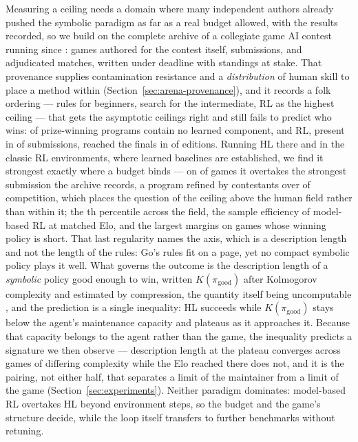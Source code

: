 Measuring a ceiling needs a domain where many independent authors already pushed the
symbolic paradigm as far as a real budget allowed, with the results recorded, so we
build \benchname on the complete archive of a collegiate game AI contest running
since :
games authored for the contest itself,  submissions, and 
adjudicated matches, written under deadline with standings at stake. That provenance
supplies contamination resistance and a \emph{distribution} of human skill to place a
method within (Section~\ref{sec:arena-provenance}), and it records a folk ordering --- rules
for beginners, search for the intermediate, RL as the highest ceiling --- that gets
the asymptotic ceilings right and still fails to predict who wins:  of
prize-winning programs contain no learned component, and RL, present in  of
submissions, reached the finals in  of  editions. Running
HL there and in the classic RL environments, where learned baselines are established,
we find it strongest exactly where a budget binds --- on  of
 games it overtakes the strongest submission the archive records, a
program refined by contestants over  of competition, which places
the question of the ceiling above the human field rather than within it; the
th percentile across the field,  the sample efficiency of
model-based RL at matched Elo, and the largest margins on games whose winning
policy is short. That last
regularity names the axis, which is a description length and not the length of the
rules: Go's rules fit on a page, yet no compact symbolic policy plays it well. What
governs the outcome is the description length of a \emph{symbolic} policy good enough
to win, written $K(\pi_{\mathrm{good}})$ after Kolmogorov complexity and estimated by
compression, the quantity itself being uncomputable
\citep{lividanyi2019kolmogorov,rissanen1978mdl}, and the prediction is a single
inequality: HL succeeds while $K(\pi_{\mathrm{good}})$ stays below the agent's
maintenance capacity and plateaus as it approaches it. Because that capacity belongs
to the agent rather than the game, the inequality predicts a signature we then
observe --- description length at the plateau converges across games of differing
complexity while the Elo reached there does not, and it is the pairing, not either
half, that separates a limit of the maintainer from a limit of the game
(Section~\ref{sec:experiments}). Neither paradigm dominates: model-based RL overtakes
HL beyond  environment steps, so the budget and the game's structure
decide, while the loop itself transfers to  further benchmarks without
retuning.

